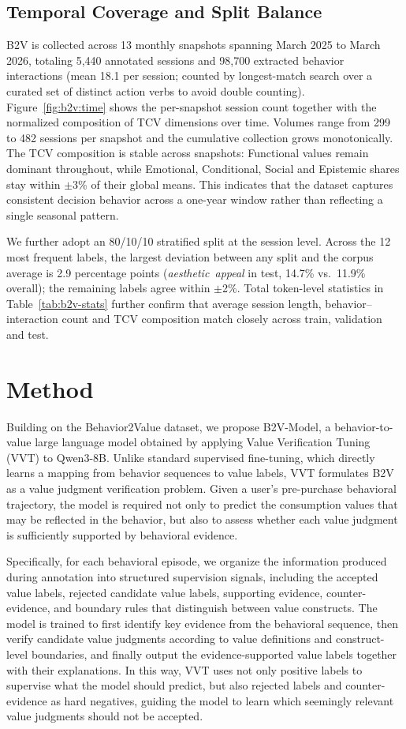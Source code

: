 \documentclass[11pt]{article}
\begin{document}
\subsection{Temporal Coverage and Split Balance}
B2V is collected across 13 monthly snapshots spanning March 2025 to March
2026, totaling 5{,}440 annotated sessions and 98{,}700 extracted behavior
interactions (mean 18.1 per session; counted by longest-match search over a
curated set of distinct action verbs to avoid double counting). Figure~\ref{fig:b2v:time} shows the per-snapshot session
count together with the normalized composition of TCV dimensions over time.
Volumes range from 299 to 482 sessions per snapshot and the cumulative
collection grows monotonically. The TCV composition is stable across
snapshots: Functional values remain dominant throughout, while Emotional,
Conditional, Social and Epistemic shares stay within $\pm$3\% of their
global means. This indicates that the dataset captures consistent decision
behavior across a one-year window rather than reflecting a single seasonal
pattern.

We further adopt an 80/10/10 stratified split at the session level. Across
the 12 most frequent labels, the largest deviation between any split and
the corpus average is 2.9 percentage points (\emph{aesthetic~appeal} in
test, 14.7\% vs.\ 11.9\% overall); the remaining labels agree within
$\pm$2\%. Total token-level statistics in Table~\ref{tab:b2v-stats}
further confirm that average session length, behavior--interaction count
and TCV composition match closely across train, validation and test.


\section{Method}
Building on the Behavior2Value dataset, we propose B2V-Model, a behavior-to-value large language model obtained by applying Value Verification Tuning (VVT) to Qwen3-8B. Unlike standard supervised fine-tuning, which directly learns a mapping from behavior sequences to value labels, VVT formulates B2V as a value judgment verification problem. Given a user’s pre-purchase behavioral trajectory, the model is required not only to predict the consumption values that may be reflected in the behavior, but also to assess whether each value judgment is sufficiently supported by behavioral evidence.

Specifically, for each behavioral episode, we organize the information produced during annotation into structured supervision signals, including the accepted value labels, rejected candidate value labels, supporting evidence, counter-evidence, and boundary rules that distinguish between value constructs. The model is trained to first identify key evidence from the behavioral sequence, then verify candidate value judgments according to value definitions and construct-level boundaries, and finally output the evidence-supported value labels together with their explanations. In this way, VVT uses not only positive labels to supervise what the model should predict, but also rejected labels and counter-evidence as hard negatives, guiding the model to learn which seemingly relevant value judgments should not be accepted.
\end{document}
